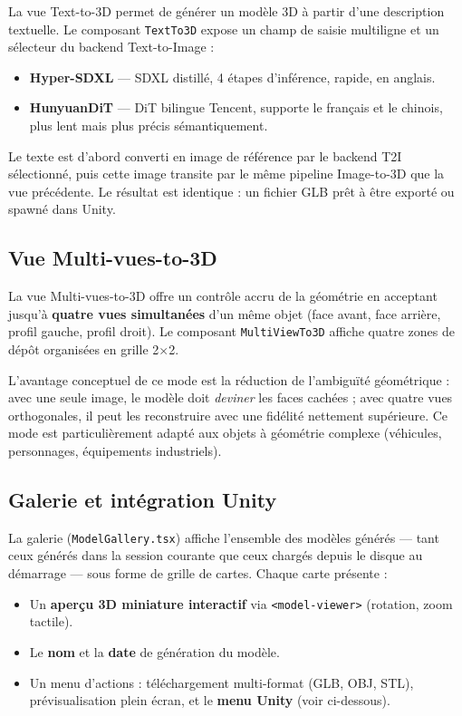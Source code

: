 \documentclass[12pt,a4paper,oneside]{report}
\begin{document}
La vue Text-to-3D permet de générer un modèle 3D à partir d'une
description textuelle. Le composant \texttt{TextTo3D} expose un champ
de saisie multiligne et un sélecteur du backend Text-to-Image :

\begin{itemize}
  \item \textbf{Hyper-SDXL} --- SDXL distillé, 4 étapes d'inférence,
    rapide, en anglais.
  \item \textbf{HunyuanDiT} --- DiT bilingue Tencent, supporte le
    français et le chinois, plus lent mais plus précis sémantiquement.
\end{itemize}

Le texte est d'abord converti en image de référence par le backend T2I
sélectionné, puis cette image transite par le même pipeline
Image-to-3D que la vue précédente. Le résultat est identique : un
fichier GLB prêt à être exporté ou spawné dans Unity.

\subsection{Vue Multi-vues-to-3D}

La vue Multi-vues-to-3D offre un contrôle accru de la géométrie en
acceptant jusqu'à \textbf{quatre vues simultanées} d'un même objet
(face avant, face arrière, profil gauche, profil droit). Le composant
\texttt{MultiViewTo3D} affiche quatre zones de dépôt organisées en
grille 2$\times$2.

L'avantage conceptuel de ce mode est la réduction de l'ambiguïté
géométrique : avec une seule image, le modèle doit \textit{deviner}
les faces cachées ; avec quatre vues orthogonales, il peut les
reconstruire avec une fidélité nettement supérieure. Ce mode est
particulièrement adapté aux objets à géométrie complexe (véhicules,
personnages, équipements industriels).

\subsection{Galerie et intégration Unity}

La galerie (\texttt{ModelGallery.tsx}) affiche l'ensemble des modèles
générés --- tant ceux générés dans la session courante que ceux chargés
depuis le disque au démarrage --- sous forme de grille de cartes.
Chaque carte présente :

\begin{itemize}
  \item Un \textbf{aperçu 3D miniature interactif} via
    \texttt{<model-viewer>} (rotation, zoom tactile).
  \item Le \textbf{nom} et la \textbf{date} de génération du modèle.
  \item Un menu d'actions : téléchargement multi-format (GLB, OBJ,
    STL), prévisualisation plein écran, et le \textbf{menu Unity} (voir
    ci-dessous).
\end{itemize}
\end{document}

